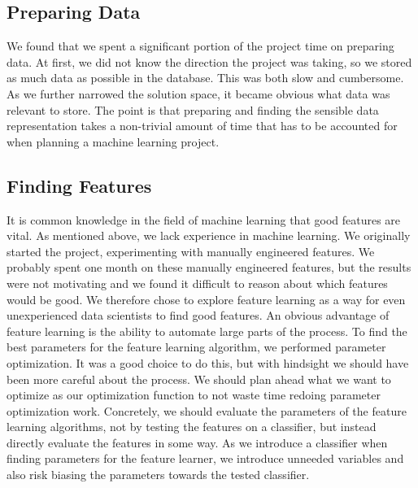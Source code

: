 \subsection{Preparing Data}
We found that we spent a significant portion of the project time on preparing data. At first, we did not know the direction the project was taking, so we stored as much data as possible in the database. This was both slow and cumbersome. As we further narrowed the solution space, it became obvious what data was relevant to store. The point is that preparing and finding the sensible data representation takes a non-trivial amount of time that has to be accounted for when planning a machine learning project.

\subsection{Finding Features}
It is common knowledge in the field of machine learning that good features are vital. As mentioned above, we lack experience in machine learning. We originally started the project, experimenting with manually engineered features. We probably spent one month on these manually engineered features, but the results were not motivating and we found it difficult to reason about which features would be good. We therefore chose to explore feature learning as a way for even unexperienced data scientists to find good features. An obvious advantage of feature learning is the ability to automate large parts of the process. To find the best parameters for the feature learning algorithm, we performed parameter optimization. It was a good choice to do this, but with hindsight we should have been more careful about the process. We should plan ahead what we want to optimize as our optimization function to not waste time redoing parameter optimization work. Concretely, we should evaluate the parameters of the feature learning algorithms, not by testing the features on a classifier, but instead directly evaluate the features in some way. As we introduce a classifier when finding parameters for the feature learner, we introduce unneeded variables and also risk biasing the parameters towards the tested classifier.

